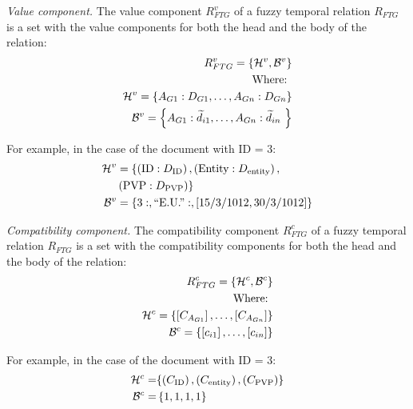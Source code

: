 \begin{definition}
\label{def:value-component}
\emph{Value component.}
The value component $R^{v}_{FTG}$ of a fuzzy temporal relation $R_{FTG}$ is a set with the value components for both the head and the body of the relation:
\begin{align}
\label{eq:value-component}
R^{v}_{FTG} = \left \lbrace \mathcal{H}^{v},\mathcal{B}^{v} \right \rbrace \\
\nonumber
\text{Where: } \\
\nonumber
\mathcal{H}^{v} = \left \lbrace A_{G1}:D_{G1}, \ldots,  A_{Gn}:D_{Gn} \right \rbrace \\
\nonumber
\mathcal{B}^ {v} = \left \lbrace A_{G1}:\widetilde{d}_{i1}, \ldots,  A_{Gn}:\widetilde{d}_{in}\ \right \rbrace 
\end{align}
\end{definition}

For example, in the case of the document with ID = 3:
\begin{align}
\nonumber
\mathcal{H}^{v} &=  \lbrace \left(\text{ID}:D_{\text{ID}}\right), \left(\text{Entity}:D_{\text{entity}}\right),\\
\nonumber
& \left(\text{PVP}:D_{\text{PVP}}\right) \rbrace \\
\nonumber
\mathcal{B}^ {v} &= \left \lbrace 3:, \text{``E.U.''}: ,  \left[15/3/1012, 30/3/1012\right] \right \rbrace 
\end{align}


\begin{definition}
\label{def:compatibility-component}
\emph{Compatibility component.}
The compatibility component $R^{c}_{FTG}$ of a fuzzy temporal relation $R_{FTG}$ is a set with the compatibility components for both the head and the body of the relation:
\begin{align}
\label{eq:compatibility-component}
R^{c}_{FTG} = \left \lbrace \mathcal{H}^{c},\mathcal{B}^{c} \right \rbrace \\
\nonumber
\text{Where: } \\
\nonumber
\mathcal{H}^{c} = \left \lbrace \left[C_{A_{G1}} \right], \ldots,  \left[C_{A_{Gn}} \right] \right \rbrace \\
\nonumber
\mathcal{B}^ {c} = \left \lbrace \left[ c_{i1} \right], \ldots, \left[ c_{in} \right] \right \rbrace 
\end{align}
\end{definition}

For example, in the case of the document with ID = 3:
\begin{align}
\nonumber
\mathcal{H}^{c} = & \lbrace \left(C_\text{ID}\right), \left(C_{\text{entity}}\right), \left(C_{\text{PVP}}\right) \rbrace \\
\nonumber
\mathcal{B}^ {c} = &\left \lbrace 1, 1, 1, 1 \right \rbrace 
\end{align}


